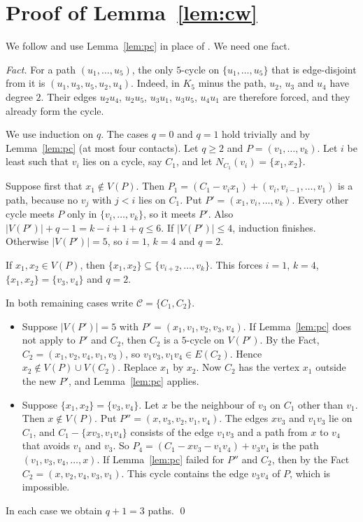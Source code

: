 \documentclass[11pt]{amsart}
\theoremstyle{definition}
\theoremstyle{remark}
\newcommand{\cyc}{\mathcal{C}}
\begin{document}
\section{Proof of Lemma~\ref{lem:cw}}\label{sec:cw}

We follow \cite{CW} and use Lemma~\ref{lem:pc} in place of \cite[Lemma 2.1]{CFL}. We need one
fact.

\emph{Fact.} For a path $(u_1,\dots,u_5)$, the only $5$-cycle on $\{u_1,\dots,u_5\}$ that is
edge-disjoint from it is $(u_1,u_3,u_5,u_2,u_4)$. Indeed, in $K_5$ minus the path, $u_2$, $u_3$
and $u_4$ have degree $2$. Their edges $u_2u_4$, $u_2u_5$, $u_3u_1$, $u_3u_5$, $u_4u_1$ are therefore
forced, and they already form the cycle.

We use induction on $q$. The cases $q=0$ and $q=1$ hold trivially and by Lemma~\ref{lem:pc} (at
most four contacts). Let $q\ge 2$ and $P=(v_1,\dots,v_k)$. Let $i$ be least such that $v_i$ lies on
a cycle, say $C_1$, and let $N_{C_1}(v_i)=\{x_1,x_2\}$.

Suppose first that $x_1\notin V(P)$. Then $P_1=(C_1-v_ix_1)+(v_i,v_{i-1},\dots,v_1)$ is a path,
because no $v_j$ with $j<i$ lies on $C_1$. Put $P'=(x_1,v_i,\dots,v_k)$. Every other cycle meets
$P$ only in $\{v_i,\dots,v_k\}$, so it meets $P'$. Also $|V(P')|+q-1=k-i+1+q\le 6$. If
$|V(P')|\le 4$, induction finishes. Otherwise $|V(P')|=5$, so $i=1$, $k=4$ and $q=2$.

If $x_1,x_2\in V(P)$, then $\{x_1,x_2\}\subseteq\{v_{i+2},\dots,v_k\}$. This forces $i=1$, $k=4$,
$\{x_1,x_2\}=\{v_3,v_4\}$ and $q=2$.

In both remaining cases write $\cyc=\{C_1,C_2\}$.
\begin{itemize}[leftmargin=*]
\item Suppose $|V(P')|=5$ with $P'=(x_1,v_1,v_2,v_3,v_4)$. If Lemma~\ref{lem:pc} does not apply to
$P'$ and $C_2$, then $C_2$ is a $5$-cycle on $V(P')$. By the Fact,
$C_2=(x_1,v_2,v_4,v_1,v_3)$, so $v_1v_3,v_1v_4\in E(C_2)$. Hence $x_2\notin V(P)\cup V(C_2)$.
Replace $x_1$ by $x_2$. Now $C_2$ has the vertex $x_1$ outside the new $P'$, and
Lemma~\ref{lem:pc} applies.
\item Suppose $\{x_1,x_2\}=\{v_3,v_4\}$. Let $x$ be the neighbour of $v_3$ on $C_1$ other than
$v_1$. Then $x\notin V(P)$. Put $P''=(x,v_3,v_2,v_1,v_4)$. The edges $xv_3$ and $v_1v_3$ lie on
$C_1$, and $C_1-\{xv_3,v_1v_4\}$ consists of the edge $v_1v_3$ and a path from $x$ to $v_4$ that
avoids $v_1$ and $v_3$. So $P_4=(C_1-xv_3-v_1v_4)+v_3v_4$ is the path
$(v_1,v_3,v_4,\dots,x)$. If Lemma~\ref{lem:pc} failed for $P''$ and $C_2$, then by the Fact
$C_2=(x,v_2,v_4,v_3,v_1)$. This cycle contains the edge $v_3v_4$ of $P$, which is impossible.
\end{itemize}
In each case we obtain $q+1=3$ paths. \qed
\end{document}
